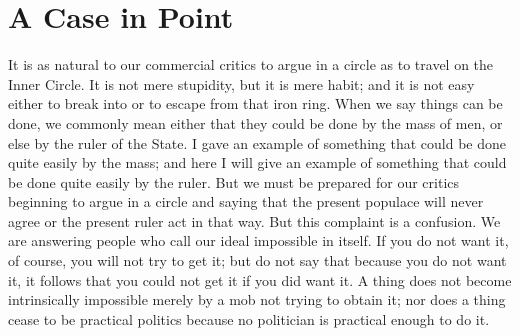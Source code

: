 \documentclass{book}
\begin{document}
\chapter{A Case in Point}
\label{chapter-8}
It is as natural to our commercial critics to argue in a circle as to travel on the Inner Circle. It is not mere stupidity, but it is mere habit; and it is not easy either to break into or to escape from that iron ring. When we say things can be done, we commonly mean either that they could be done by the mass of men, or else by the ruler of the State. I gave an example of something that could be done quite easily by the mass; and here I will give an example of something that could be done quite easily by the ruler. But we must be prepared for our critics beginning to argue in a circle and saying that the present populace will never agree or the present ruler act in that way. But this complaint is a confusion. We are answering people who call our ideal impossible in itself. If you do not want it, of course, you will not try to get it; but do not say that because you do not want it, it follows that you could not get it if you did want it. A thing does not become intrinsically impossible merely by a mob not trying to obtain it; nor does a thing cease to be practical politics because no politician is practical enough to do it.
\end{document}

